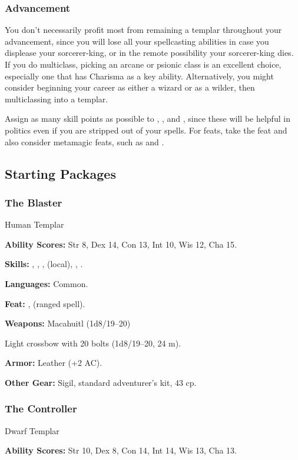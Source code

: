 \subsubsection{Advancement}
You don't necessarily profit most from remaining a templar throughout your advancement, since you will lose all your spellcasting abilities in case you displease your sorcerer-king, or in the remote possibility your sorcerer-king dies. If you do multiclass, picking an arcane or psionic class is an excellent choice, especially one that has Charisma as a key ability. Alternatively, you might consider beginning your career as either a wizard or as a wilder, then multiclassing into a templar.

Assign as many skill points as possible to , , and , since these will be helpful in politics even if you are stripped out of your spells. For feats, take the  feat and also consider metamagic feats, such as  and .


\subsection{Starting Packages}
\subsubsection{The Blaster}
Human Templar

\textbf{Ability Scores:} Str 8, Dex 14, Con 13, Int 10, Wis 12, Cha 15.

\textbf{Skills:} , , ,  (local), , .

\textbf{Languages:} Common.

\textbf{Feat:} ,  (ranged spell).

\textbf{Weapons:} Macahuitl (1d8/19--20)

Light crossbow with 20 bolts (1d8/19--20, 24 m).

\textbf{Armor:} Leather (+2 AC).

\textbf{Other Gear:} Sigil, standard adventurer's kit, 43 cp.

\subsubsection{The Controller}
Dwarf Templar

\textbf{Ability Scores:} Str 10, Dex 8, Con 14, Int 14, Wis 13, Cha 13.

